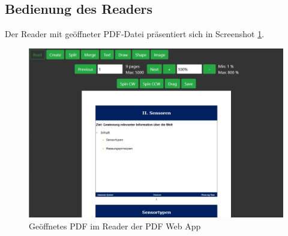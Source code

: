 \subsection{Bedienung des Readers}
Der Reader mit geöffneter PDF-Datei präsentiert sich in Screenshot \ref{fig:reader}.

\begin{figure}[!htbp]
	\centering
	\includegraphics[width=1\textwidth]{"images/reader.png"}
	\caption{Geöffnetes PDF im Reader der PDF Web App}
	\label{fig:reader}
\end{figure}

